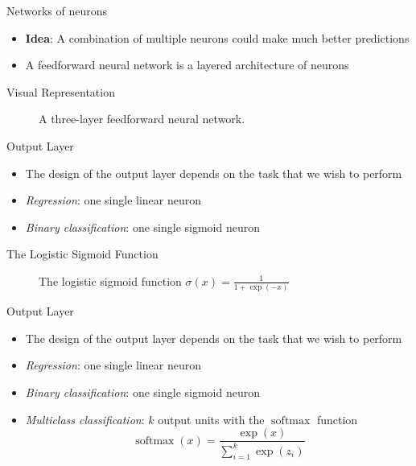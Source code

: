\documentclass{beamer}
\DeclareMathOperator{\softmax}{softmax}
\begin{document}
	\begin{frame}{Networks of neurons}
		\begin{itemize}
			\item <1-> \textbf{Idea}: A combination of multiple neurons could make much better predictions
			\item <2-> A feedforward neural network is a layered architecture of neurons
		\end{itemize}
	\end{frame}
	\begin{frame}{Visual Representation}
		\begin{figure}
			
			\caption{A three-layer feedforward neural network.}
		\end{figure}
	\end{frame}
	\begin{frame}{Output Layer}
		\begin{itemize}
			\item <1-> The design of the output layer depends on the task that we wish to perform
			\item <2-> \emph{Regression}: one single linear neuron
			\item <3-> \emph{Binary classification}: one single sigmoid neuron
		\end{itemize}
	\end{frame}
	\begin{frame}{The Logistic Sigmoid Function}
		\begin{figure}
			\begin{center}
				
			\end{center}
			\caption{The logistic sigmoid function $\sigma(x) = \frac1{1+\exp(-x)}$}
			\label{fig:sigmoid}
		\end{figure}
	\end{frame}
	\begin{frame}{Output Layer}
		\begin{itemize}
			\item <1-> The design of the output layer depends on the task that we wish to perform
			\item <1-> \emph{Regression}: one single linear neuron
			\item <1-> \emph{Binary classification}: one single sigmoid neuron
			\item <1-> \emph{Multiclass classification}: $k$ output units with the $\softmax$ function
			\begin{equation}\label{eq:softmax}
			\softmax(x) = \frac{\exp(x)}{\sum_{i=1}^{k}\exp(z_i)}
			\end{equation}
		\end{itemize}
	\end{frame}
\end{document}
